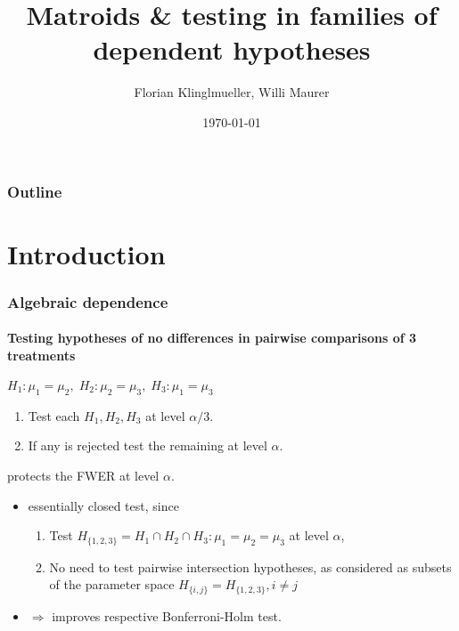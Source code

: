 \documentclass[bigger]{beamer}
\title{Matroids \& testing in families of dependent hypotheses}
\author{Florian Klinglmueller, Willi Maurer}
\date{\today}
\begin{document}
\maketitle



\begin{frame}
\frametitle{Outline}
\setcounter{tocdepth}{3}
\tableofcontents
\end{frame}




\section{Introduction}


\begin{frame}
\frametitle{Algebraic dependence}
\framesubtitle{Testing hypotheses of no differences in pairwise
  comparisons of 3 treatments}


\begin{block}{$H_1:\mu_1=\mu_2,\; H_2:\mu_2=\mu_3,\;H_3:\mu_1=\mu_3$}
  \begin{enumerate}
  \item Test each $H_1,H_2,H_3$ at level $\alpha/3$.
  \item If any is rejected test the remaining at level $\alpha$.
  \end{enumerate}
  protects the FWER at level $\alpha$.
\end{block}
\pause
  \begin{itemize}
    \item  essentially closed test, since %
      \begin{enumerate}
        \item Test $H_ {\{1,2,3\}} = H_1\cap H_2 \cap H_3 :
          \mu_1=\mu_2=\mu_3$ at level $\alpha$,
        \item No need to test pairwise intersection hypotheses, as
          considered as subsets of the parameter space          
          $H_{\{i,j\}} = H_{\{1,2,3\}}, i\neq j$
      \end{enumerate}


    \item  $\Rightarrow$ improves respective Bonferroni-Holm test.
  \end{itemize}

\end{frame}
\end{document}
